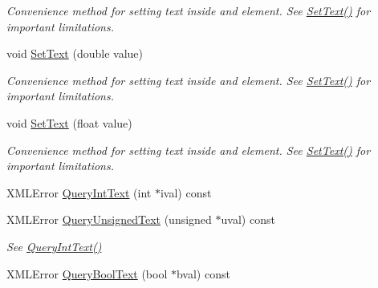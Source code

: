 \begin{DoxyCompactItemize}
\begin{DoxyCompactList}\small\item\em Convenience method for setting text inside and element. See \hyperlink{classtinyxml2_1_1_x_m_l_element_a1f9c2cd61b72af5ae708d37b7ad283ce}{Set\+Text()} for important limitations. \end{DoxyCompactList}\item 
void \hyperlink{classtinyxml2_1_1_x_m_l_element_a67bd77ac9aaeff58ff20b4275a65ba4e}{Set\+Text} (double value)\hypertarget{classtinyxml2_1_1_x_m_l_element_a67bd77ac9aaeff58ff20b4275a65ba4e}{}\label{classtinyxml2_1_1_x_m_l_element_a67bd77ac9aaeff58ff20b4275a65ba4e}

\begin{DoxyCompactList}\small\item\em Convenience method for setting text inside and element. See \hyperlink{classtinyxml2_1_1_x_m_l_element_a1f9c2cd61b72af5ae708d37b7ad283ce}{Set\+Text()} for important limitations. \end{DoxyCompactList}\item 
void \hyperlink{classtinyxml2_1_1_x_m_l_element_a51d560da5ae3ad6b75e0ab9ffb2ae42a}{Set\+Text} (float value)\hypertarget{classtinyxml2_1_1_x_m_l_element_a51d560da5ae3ad6b75e0ab9ffb2ae42a}{}\label{classtinyxml2_1_1_x_m_l_element_a51d560da5ae3ad6b75e0ab9ffb2ae42a}

\begin{DoxyCompactList}\small\item\em Convenience method for setting text inside and element. See \hyperlink{classtinyxml2_1_1_x_m_l_element_a1f9c2cd61b72af5ae708d37b7ad283ce}{Set\+Text()} for important limitations. \end{DoxyCompactList}\item 
X\+M\+L\+Error \hyperlink{classtinyxml2_1_1_x_m_l_element_a71327c9a9d8840562bd204f46d0a7189}{Query\+Int\+Text} (int $\ast$ival) const 
\item 
X\+M\+L\+Error \hyperlink{classtinyxml2_1_1_x_m_l_element_a2192091dec0c06be8b14f4e912c01758}{Query\+Unsigned\+Text} (unsigned $\ast$uval) const \hypertarget{classtinyxml2_1_1_x_m_l_element_a2192091dec0c06be8b14f4e912c01758}{}\label{classtinyxml2_1_1_x_m_l_element_a2192091dec0c06be8b14f4e912c01758}

\begin{DoxyCompactList}\small\item\em See \hyperlink{classtinyxml2_1_1_x_m_l_element_a71327c9a9d8840562bd204f46d0a7189}{Query\+Int\+Text()} \end{DoxyCompactList}\item 
X\+M\+L\+Error \hyperlink{classtinyxml2_1_1_x_m_l_element_afeb060672fa934163fc573e692b7fe38}{Query\+Bool\+Text} (bool $\ast$bval) const \hypertarget{classtinyxml2_1_1_x_m_l_element_afeb060672fa934163fc573e692b7fe38}{}\label{classtinyxml2_1_1_x_m_l_element_afeb060672fa934163fc573e692b7fe38}


\end{DoxyCompactItemize}
